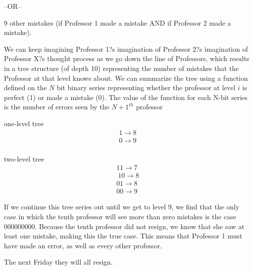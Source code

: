 \documentclass[a4paper,12pt]{article}
\begin{document}
--OR--

9 other mistakes (if Professor 1 made a mistake AND if Professor 2 made a mistake).


We can keep imagining Professor 1?s imagination of Professor 2?s imagination of Professor X?s thought process as we go down the line of Professors, which results in a tree structure (of depth 10) representing the number of mistakes that the Professor at that level knows about. We can summarize the tree using a function defined on the $N$ bit binary series representing whether the professor at level $i$ is perfect (1) or made a mistake (0). The value of the function for each N-bit series is the number of errors seen by the $N+1^{th}$ professor

one-level tree
\begin{align*}
1 \rightarrow 8\\
0 \rightarrow 9\\
\end{align*}

two-level tree
\begin{align*}
11 \rightarrow 7\\\
10 \rightarrow 8\\
01 \rightarrow 8\\
00 \rightarrow 9
\end{align*}


If we continue this tree series out until we get to level 9, we find that the only case in which the tenth professor will see more than zero mistakes is the case 000000000. Because the tenth professor did not resign, we know that she saw at least one mistake, making this the true case. This means that Professor 1 must have made an error, as well as every other professor.

The next Friday they will all resign.
\end{document}
